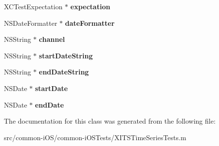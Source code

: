 \begin{DoxyCompactItemize}
X\+C\+Test\+Expectation $\ast$ {\bfseries expectation}
\item 
\hypertarget{interface_x_i_t_s_time_series_tests_ae15d636aec733b46b85efe0adffa4dc1}{}\label{interface_x_i_t_s_time_series_tests_ae15d636aec733b46b85efe0adffa4dc1} 
N\+S\+Date\+Formatter $\ast$ {\bfseries date\+Formatter}
\item 
\hypertarget{interface_x_i_t_s_time_series_tests_aea646e12e2dc7cee1754ca0ecc1fab47}{}\label{interface_x_i_t_s_time_series_tests_aea646e12e2dc7cee1754ca0ecc1fab47} 
N\+S\+String $\ast$ {\bfseries channel}
\item 
\hypertarget{interface_x_i_t_s_time_series_tests_a8ea5a01f0cf5f7a77b426c732bc65b69}{}\label{interface_x_i_t_s_time_series_tests_a8ea5a01f0cf5f7a77b426c732bc65b69} 
N\+S\+String $\ast$ {\bfseries start\+Date\+String}
\item 
\hypertarget{interface_x_i_t_s_time_series_tests_a81931584cf9994603534bb4534dbf5cf}{}\label{interface_x_i_t_s_time_series_tests_a81931584cf9994603534bb4534dbf5cf} 
N\+S\+String $\ast$ {\bfseries end\+Date\+String}
\item 
\hypertarget{interface_x_i_t_s_time_series_tests_aa80cb3eee25bd6a643670ef0b1fb4bd2}{}\label{interface_x_i_t_s_time_series_tests_aa80cb3eee25bd6a643670ef0b1fb4bd2} 
N\+S\+Date $\ast$ {\bfseries start\+Date}
\item 
\hypertarget{interface_x_i_t_s_time_series_tests_af78cca659d4662403a524da37ccbeb8c}{}\label{interface_x_i_t_s_time_series_tests_af78cca659d4662403a524da37ccbeb8c} 
N\+S\+Date $\ast$ {\bfseries end\+Date}
\end{DoxyCompactItemize}


The documentation for this class was generated from the following file\+:\begin{DoxyCompactItemize}
\item 
src/common-\/i\+O\+S/common-\/i\+O\+S\+Tests/X\+I\+T\+S\+Time\+Series\+Tests.\+m\end{DoxyCompactItemize}
